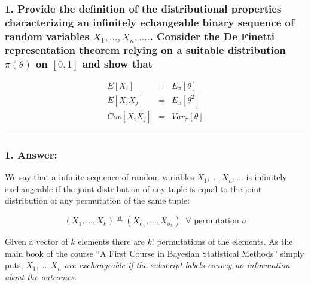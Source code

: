 \documentclass[
]{article}
\begin{document}
\hypertarget{provide-the-definition-of-the-distributional-properties-characterizing-an-infinitely-echangeable-binary-sequence-of-random-variables-x_1-...x_n-.....-consider-the-de-finetti-representation-theorem-relying-on-a-suitable-distribution-pitheta-on-01-and-show-that}{%
\subsubsection{\texorpdfstring{1. Provide the definition of the
distributional properties characterizing an infinitely echangeable
binary sequence of random variables \(X_1, ...,X_n, ....\). Consider the
De Finetti representation theorem relying on a suitable distribution
\(\pi(\theta)\) on \([0,1]\) and show
that}{1. Provide the definition of the distributional properties characterizing an infinitely echangeable binary sequence of random variables X\_1, ...,X\_n, ..... Consider the De Finetti representation theorem relying on a suitable distribution \textbackslash pi(\textbackslash theta) on {[}0,1{]} and show that}}\label{provide-the-definition-of-the-distributional-properties-characterizing-an-infinitely-echangeable-binary-sequence-of-random-variables-x_1-...x_n-.....-consider-the-de-finetti-representation-theorem-relying-on-a-suitable-distribution-pitheta-on-01-and-show-that}}

\begin{eqnarray*} 
E[X_i]&=&E_{\pi}[\theta]\\
E[X_i X_j] &=& E_{\pi}[\theta^2]\\
Cov[X_i X_j] &=& Var_{\pi}[\theta]
\end{eqnarray*}

\begin{center}\rule{0.5\linewidth}{0.5pt}\end{center}

\hypertarget{answer-10}{%
\subsubsection{1. Answer:}\label{answer-10}}

We say that a infinite sequence of random variables \(X_1,...,X_n,...\)
is infinitely exchangeable if the joint distribution of any tuple is
equal to the joint distribution of any permutation of the same tuple:

\[
(X_1,...,X_k) \stackrel{d}{=} (X_{\sigma_1},...,X_{\sigma_k}) \;\; \forall \text{ permutation } \sigma
\]

Given a vector of \(k\) elements there are \(k!\) permutations of the
elements. As the main book of the course ``A First Course in Bayesian
Statistical Methods'' simply puts, \emph{\(X_1,...,X_n\) are
exchangeable if the subscript labels convey no information about the
outcomes}.
\end{document}
